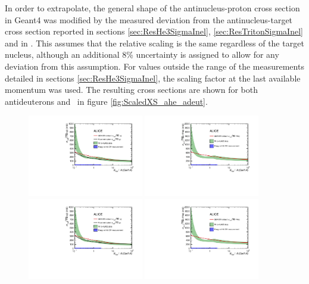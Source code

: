 In order to extrapolate, the general shape of the antinucleus-proton cross section in Geant4 was modified by the measured deviation from the antinucleus-target cross section reported in sections \ref{sec:ResHe3SigmaInel}, \ref{sec:ResTritonSigmaInel} and in \cite{}. This assumes that the relative scaling is the same regardless of the target nucleus, although an additional 8\% uncertainty is assigned to allow for any deviation from this assumption. For values outside the range of the measurements detailed in sections \ref{sec:ResHe3SigmaInel}, the scaling factor at the last available momentum was used.
The resulting cross sections are shown for both antideuterons and \ahe\ in figure \ref{fig:ScaledXS_ahe_adeut}. 

\begin{figure}
    \centering
    \includegraphics[width=0.45\textwidth]{figures/Antihelum_on_p_targets_scaled_with_paramterisation.pdf}
    \includegraphics[width=0.45\textwidth]{figures/Antihelum_on_p_targets_scaled.pdf}
     \includegraphics[width=0.45\textwidth]{figures/Antihelum_on_p_targets_scaled_with_paramterisation.pdf}
    \includegraphics[width=0.45\textwidth]{figures/Antihelum_on_p_targets_scaled.pdf}

\end{figure}
